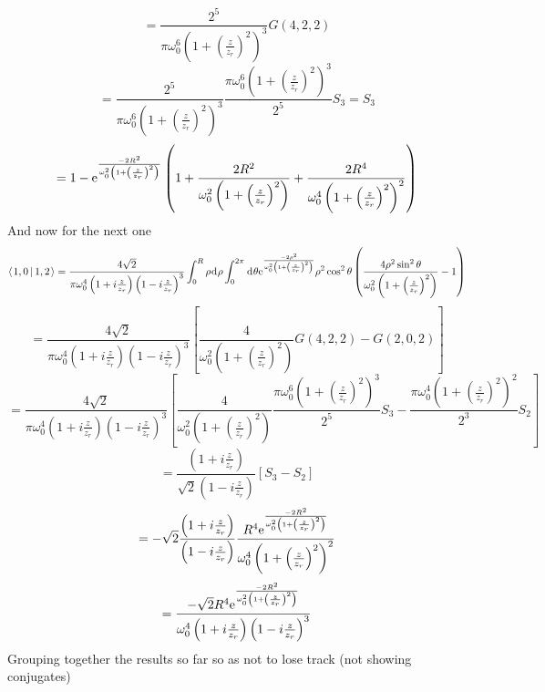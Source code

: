 \documentclass[11pt]{amsart}
\makeatletter
\newcommand{\e}{{\rm e}}				%
\newcommand{\msp}[1]{\mspace{#1mu}}		%
\newcommand{\0}{\varnothing}		%
\newcommand{\dd}{\msp{1} {\rm{d}} \msp{1}}	%
\newcommand{\brac}[2]{\left\langle\msp{2} #1\left\lvert \msp{3.5} #2 \right.\right\rangle}	%
\newcommand{\1}{!}
\newcommand{\2}{@}
\newcommand{\3}{\#}
\newcommand{\4}{\$}
\newcommand{\5}{\%}
\newcommand{\6}{$^\wedge$}
\newcommand{\7}{\&}
\newcommand{\8}{*}
\newcommand{\9}{(}
\makeatother
\begin{document}
\[
=\frac{2^5}{\pi \omega_0^6\left(1+\left(\frac{z}{z_r}\right)^2\right)^3}G(4,2,2)
\]
\[
= \frac{2^5}{\pi \omega_0^6\left(1+\left(\frac{z}{z_r}\right)^2\right)^3}\frac{\pi\omega_0^6\left(1+\left(\frac{z}{z_r}\right)^2\right)^3}{2^5}S_3 = S_3
\]
\[
=1-\e^{\frac{-2R^2}{\omega_0^2\left(1+\left(\frac{z}{z_r}\right)^2\right)}}\left(1+\frac{2R^2}{\omega_0^2\left(1+\left(\frac{z}{z_r}\right)^2\right)}+\frac{2R^4}{\omega_0^4\left(1+\left(\frac{z}{z_r}\right)^2\right)^2}\right)
\]
And now for the next one
\[
\brac{1,0}{1,2} = \frac{4\sqrt{2}}{\pi\omega_0^4\left(1+i\frac{z}{z_r}\right)\left(1-i\frac{z}{z_r}\right)^3}\int_0^R \rho \dd \rho \int_0^{2\pi}\dd \theta \e^{\frac{-2\rho^2}{\omega_0^2\left(1+\left(\frac{z}{z_r}\right)^2\right)}}\rho^2\cos^2\theta \left(\frac{4\rho^2\sin^2\theta}{\omega_0^2\left(1+\left(\frac{z}{z_r}\right)^2\right)}-1\right)
\]
\[
=\frac{4\sqrt{2}}{\pi\omega_0^4\left(1+i\frac{z}{z_r}\right)\left(1-i\frac{z}{z_r}\right)^3}\left[\frac{4}{\omega_0^2\left(1+\left(\frac{z}{z_r}\right)^2\right)}G(4,2,2)-G(2,0,2)\right]
\]
\[
=\frac{4\sqrt{2}}{\pi\omega_0^4\left(1+i\frac{z}{z_r}\right)\left(1-i\frac{z}{z_r}\right)^3}\left[\frac{4}{\omega_0^2\left(1+\left(\frac{z}{z_r}\right)^2\right)}\frac{\pi\omega_0^6\left(1+\left(\frac{z}{z_r}\right)^2\right)^3}{2^5}S_3 - \frac{\pi\omega_0^4\left(1+\left(\frac{z}{z_r}\right)^2\right)^2}{2^3}S_2\right]
\]
\[
=\frac{\left(1+i\frac{z}{z_r}\right)}{\sqrt{2}\left(1-i\frac{z}{z_r}\right)}\left[S_3-S_2\right]
\]
\[
=-\sqrt{2}\frac{\left(1+i\frac{z}{z_r}\right)}{\left(1-i\frac{z}{z_r}\right)}\frac{R^4\e^{\frac{-2R^2}{\omega_0^2\left(1+\left(\frac{z}{z_r}\right)^2\right)}}}{\omega_0^4\left(1+\left(\frac{z}{z_r}\right)^2\right)^2}
\]
\[
=\frac{-\sqrt{2}R^4\e^{\frac{-2R^2}{\omega_0^2\left(1+\left(\frac{z}{z_r}\right)^2\right)}}}{\omega_0^4\left(1+i\frac{z}{z_r}\right)\left(1-i\frac{z}{z_r}\right)^3}
\]
Grouping together the results so far so as not to lose track (not showing conjugates)
\end{document}
